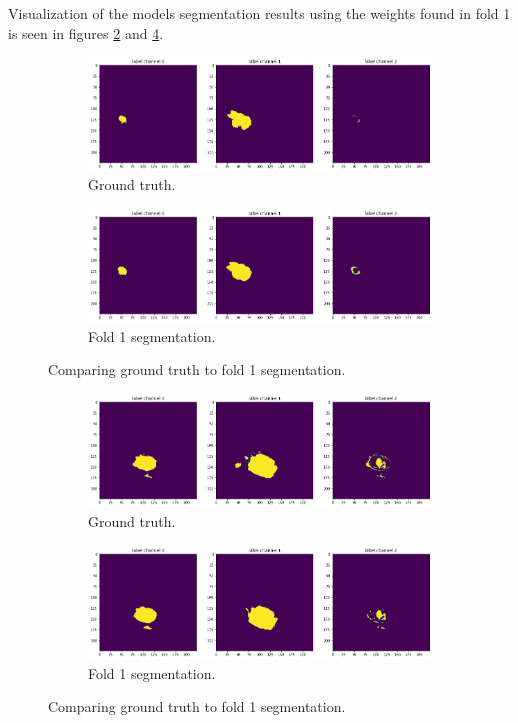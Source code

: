 \documentclass[10pt,twocolumn,letterpaper]{article}
\begin{document}
Visualization of the models segmentation results using the weights found in fold 1 is seen in figures \ref{fig: viz result 1} and \ref{fig: viz result 2}.

\begin{figure}[!h]
	\begin{subfigure}{\textwidth}
		\includegraphics[width=0.5\linewidth]{images/outputvisualization1 - truth.png}
	\caption{Ground truth.}
	\end{subfigure}
	\bigskip
	\begin{subfigure}{\textwidth}
		\includegraphics[width=0.5\linewidth]{images/outputvisualization1 - seg.png}
	\caption{Fold 1 segmentation.}
	\label{fig: viz result 1}
	\end{subfigure}
	\caption{Comparing ground truth to fold 1 segmentation.}
\end{figure}

\begin{figure}[!h]
	\begin{subfigure}{\textwidth}
		\includegraphics[width=0.5\linewidth]{images/outputvisualization2 - truth.png}
	\caption{Ground truth.}
	\end{subfigure}
	\bigskip
	\begin{subfigure}{\textwidth}
		\includegraphics[width=0.5\linewidth]{images/outputvisualization2 - seg.png}
	\caption{Fold 1 segmentation.}
	\label{fig: viz result 2}
	\end{subfigure}
	\caption{Comparing ground truth to fold 1 segmentation.}
\end{figure}
\end{document}
